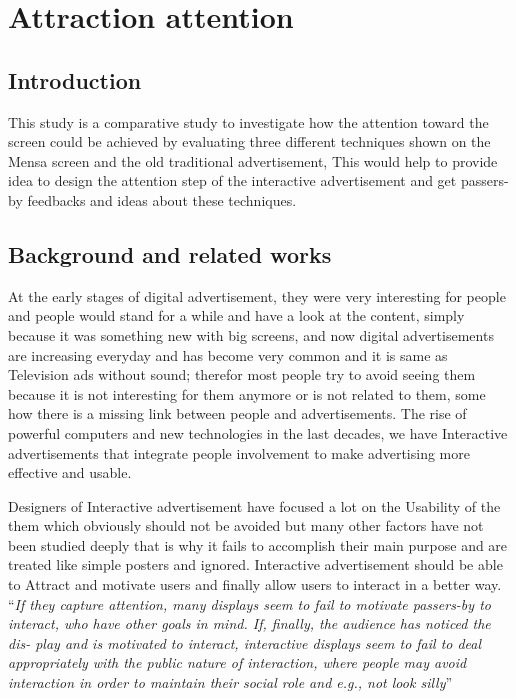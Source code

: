 \newcommand{\hilight}[1]{\colorbox{yellow}{#1}}

\chapter{Attraction attention} %

\label{Chapter3} %


\section{Introduction}
This study is a comparative study to investigate how the attention toward the screen could be achieved by evaluating three different techniques shown on the Mensa screen and the old traditional advertisement, This would help to provide idea to design the attention step of the interactive advertisement and get passers-by feedbacks and ideas about these techniques.

\section{Background and related works}
At the early stages of digital advertisement, they were very interesting for people and people would stand for a while and have a look at the content, simply because it was something new with big screens, and now digital advertisements are increasing everyday and has become very common and it is same as Television ads without sound; therefor most people try to avoid seeing them because it is not interesting for them anymore or is not related to them, some how there is a missing link between people and advertisements. The rise of powerful computers and new technologies in the last decades, we have Interactive advertisements that integrate people involvement to make advertising more effective and usable.

Designers of Interactive advertisement have focused a lot on the Usability of the them which obviously should not be avoided but many other factors have not been studied deeply that is why it fails to accomplish their main purpose and are treated like simple posters and ignored. Interactive advertisement should be able to Attract and motivate users and finally allow users to interact in a better way. ``\emph{If they capture attention, many displays seem to fail to motivate passers-by to interact, who have other goals in mind. If, finally, the audience has noticed the dis- play and is motivated to interact, interactive displays seem to fail to deal appropriately with the public nature of interaction, where people may avoid interaction in order to maintain their social role and e.g., not look silly}''\cite{DesignSpace}


